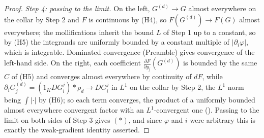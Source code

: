 \begin{proof}
\emph{Step 4: passing to the limit.}  On the left, $G^{(d)}\to G$ almost
everywhere on the collar by Step 2 and $F$ is continuous by (H4), so
$F(G^{(d)})\to F(G)$ almost everywhere; the mollifications inherit the bound
$L$ of Step 1 up to a constant, so by (H5) the integrands are uniformly
bounded by a constant multiple of $|\partial_i\varphi|$, which is integrable.
Dominated convergence (Preamble) gives convergence of the left-hand side.  On
the right, each coefficient $\frac{\partial F}{\partial y_j}(G^{(d)})$ is
bounded by the same $C$ of (H5) and converges almost everywhere by continuity
of $dF$, while $\partial_iG^{(d)}_j=(1_KDG^j_i)*\rho_d\to DG^j_i$ in $L^1$ on
the collar by Step 2, the $L^1$ norm being $\int|\cdot|$ by (H6); so each term
converges, the product of a uniformly bounded almost everywhere convergent
factor with an $L^1$-convergent one ().
Passing to the limit on both sides of Step 3 gives $(\ast)$, and since
$\varphi$ and $i$ were arbitrary this is exactly the weak-gradient identity
asserted.
\end{proof}

